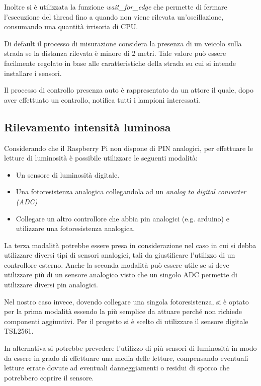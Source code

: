 Inoltre si è utilizzata la funzione \textit{wait\_for\_edge} che permette di fermare l'esecuzione del thread fino a quando non viene rilevata un'oscillazione, consumando una quantità irrisoria di CPU.

Di default il processo di misurazione considera la presenza di un veicolo sulla strada se la distanza rilevata è minore di 2 metri.
Tale valore può essere facilmente regolato in base alle caratteristiche della strada su cui si intende installare i sensori.

Il processo di controllo presenza auto è rappresentato da un attore il quale, dopo aver effettuato un controllo, notifica tutti i lampioni interessati.

\newpage


\subsection{Rilevamento intensità luminosa}

Considerando che il Raspberry Pi non dispone di PIN analogici, per effettuare le letture di luminosità è possibile utilizzare le seguenti modalità:
\begin{itemize}
	\item Un sensore di luminosità digitale.
	\item Una fotoresistenza analogica collegandola ad un \textit{analog to digital converter (ADC)}
	\item Collegare un altro controllore che abbia pin analogici (e.g. arduino) e utilizzare una fotoresistenza analogica.
\end{itemize}

La terza modalità potrebbe essere presa in considerazione nel caso in cui si debba utilizzare diversi tipi di sensori analogici, tali da giustificare l'utilizzo di un controllore esterno.
Anche la seconda modalità può essere utile se si deve utilizzare più di un sensore analogico visto che un singolo ADC permette di utilizzare diversi pin analogici.

Nel nostro caso invece, dovendo collegare una singola fotoresistenza, si è optato per la prima modalità essendo la più semplice da attuare perché non richiede componenti aggiuntivi.
Per il progetto si è scelto di utilizzare il sensore digitale TSL2561.

In alternativa si potrebbe prevedere l'utilizzo di più sensori di luminosità in modo da essere in grado di effettuare una media delle letture, compensando eventuali letture errate dovute ad eventuali danneggiamenti o residui di sporco che potrebbero coprire il sensore.

